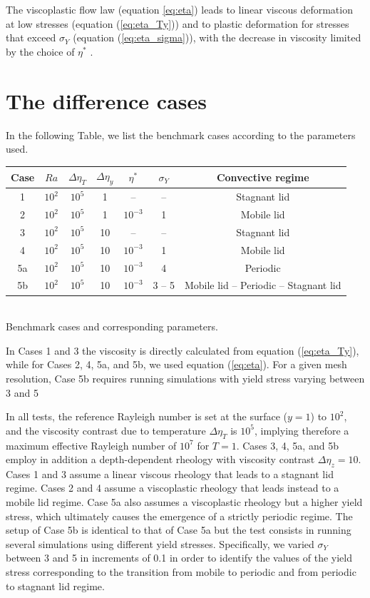 The viscoplastic flow law (equation \ref{eq:eta}) leads to linear viscous 
deformation at low stresses (equation (\ref{eq:eta_Ty})) 
and to plastic deformation for stresses that exceed $\sigma_Y$ (equation (\ref{eq:eta_sigma})), 
with the decrease in viscosity limited by the choice of $\eta^{*}$ \cite{stlh14}.

\section*{The difference cases}

In the following Table, we list the benchmark cases according to the parameters used. 
\begin{center}
\begin{tabular}{c c c c c c c} 
\hline
Case & $Ra$ & $\Delta\eta_T$ & $\Delta\eta_y$ & $\eta^*$ & $\sigma_Y$ & Convective regime \\
\hline
1   & $10^2$ & $10^5$    & 1  & -- & --             & Stagnant lid    \\
2   & $10^2$ & $10^5$    & 1  & $10^{-3}$ & 1       & Mobile lid \\
3   & $10^2$ & $10^5$    & 10 & --  & --            & Stagnant lid \\
4   & $10^2$ & $10^5$    & 10 & $10^{-3}$ & 1       & Mobile lid  \\
5a  & $10^2$ & $10^5$    & 10 & $10^{-3}$ & 4       & Periodic  \\
5b  & $10^2$ & $10^5$    & 10 & $10^{-3}$ & 3 -- 5  & Mobile lid -- Periodic -- Stagnant lid \\
\hline
\end{tabular}\\
{\small Benchmark cases and corresponding parameters.} 
\end{center}

In Cases 1 and 3 the viscosity is directly calculated from equation (\ref{eq:eta_Ty}), 
while for Cases 2, 4, 5a, and 5b, we used equation (\ref{eq:eta}). For a given mesh resolution, 
Case 5b requires running simulations with yield stress varying between 3 and 5

In all tests, the reference Rayleigh number is set at the surface ($y=1$) to $10^2$, 
and the viscosity contrast due to temperature $\Delta\eta_T$ is $10^5$, implying 
therefore a maximum effective Rayleigh number of $10^7$ for $T=1$. Cases 3, 4, 5a, and 5b 
employ in addition a depth-dependent rheology with viscosity contrast  $\Delta\eta_z=10$. 
Cases 1 and 3 assume a linear viscous rheology that leads to a stagnant lid regime. Cases 2 and 4 assume a viscoplastic rheology that leads instead to a mobile lid regime. Case 5a also assumes a viscoplastic rheology but a higher yield stress, which ultimately causes the emergence of a strictly periodic regime. The setup of Case 5b is identical to that of Case 5a but the test consists in running several simulations using different yield stresses. Specifically, we varied $\sigma_Y$ between 3 and 5 in increments of 0.1 in order to identify the values of the yield stress corresponding to the transition from mobile to periodic and from periodic to stagnant lid regime. 

